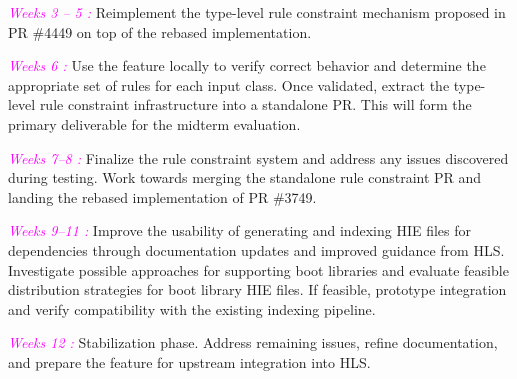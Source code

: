 \documentclass[a4paper,12pt]{article}
\begin{document}
\textcolor{magenta}{\textit{Weeks 3 -- 5 :  }}Reimplement the type-level rule constraint mechanism proposed in PR \#4449 on top of the rebased implementation.
\vspace{0.6em}

\textcolor{magenta}{\textit{Weeks 6 :  }} Use the feature locally to verify correct behavior and determine the appropriate set of rules for each input class. Once validated, extract the type-level rule constraint infrastructure into a standalone PR. This will form the primary deliverable for the midterm evaluation.
\vspace{0.6em}

\textcolor{magenta}{\textit{Weeks 7--8 :  }} Finalize the rule constraint system and address any issues discovered during testing. Work towards merging the standalone rule constraint PR and landing the rebased implementation of PR \#3749.
\vspace{0.6em}

\textcolor{magenta}{\textit{Weeks 9--11 :  }} Improve the usability of generating and indexing HIE files for dependencies through documentation updates and improved guidance from HLS. Investigate possible approaches for supporting boot libraries and evaluate feasible distribution strategies for boot library HIE files. If feasible, prototype integration and verify compatibility with the existing indexing pipeline.
\vspace{0.6em}

\textcolor{magenta}{\textit{Weeks 12 :  }} Stabilization phase. Address remaining issues, refine documentation, and prepare the feature for upstream integration into HLS.
\end{document}
